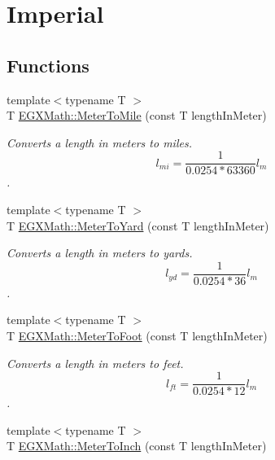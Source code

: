 \hypertarget{group___e_g_x_math-_conversions-_length_conversions-_s_i-_meter-_imperial}{}\section{Imperial}
\label{group___e_g_x_math-_conversions-_length_conversions-_s_i-_meter-_imperial}
\subsection*{Functions}
\begin{DoxyCompactItemize}
\item 
{\footnotesize template$<$typename T $>$ }\\T \mbox{\hyperlink{group___e_g_x_math-_conversions-_length_conversions-_s_i-_meter-_imperial_gad99b2a17c589bee13f354975b326fe74}{E\+G\+X\+Math\+::\+Meter\+To\+Mile}} (const T length\+In\+Meter)
\begin{DoxyCompactList}\small\item\em Converts a length in meters to miles. \[ l_{mi}=\frac{1}{0.0254 * 63360} l_{m} \]. \end{DoxyCompactList}\item 
{\footnotesize template$<$typename T $>$ }\\T \mbox{\hyperlink{group___e_g_x_math-_conversions-_length_conversions-_s_i-_meter-_imperial_ga958e4dfc661ba34f49bc3aaebe6e30be}{E\+G\+X\+Math\+::\+Meter\+To\+Yard}} (const T length\+In\+Meter)
\begin{DoxyCompactList}\small\item\em Converts a length in meters to yards. \[ l_{yd}= \frac{1}{0.0254 * 36} l_{m} \]. \end{DoxyCompactList}\item 
{\footnotesize template$<$typename T $>$ }\\T \mbox{\hyperlink{group___e_g_x_math-_conversions-_length_conversions-_s_i-_meter-_imperial_gad5d3d7875ebe02e1a988665271360f34}{E\+G\+X\+Math\+::\+Meter\+To\+Foot}} (const T length\+In\+Meter)
\begin{DoxyCompactList}\small\item\em Converts a length in meters to feet. \[ l_{ft}= \frac{1}{0.0254 * 12} l_{m} \]. \end{DoxyCompactList}\item 
{\footnotesize template$<$typename T $>$ }\\T \mbox{\hyperlink{group___e_g_x_math-_conversions-_length_conversions-_s_i-_meter-_imperial_gaaf056673bfe97e10a61a527f4b3598ba}{E\+G\+X\+Math\+::\+Meter\+To\+Inch}} (const T length\+In\+Meter)

\end{DoxyCompactItemize}
